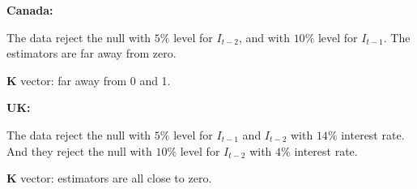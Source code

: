 \documentclass[12pt]{article}
\begin{document}
{\textbf {Canada:}}

The data reject the null with $ 5\% $ level for $ I_{t - 2} $, and with $ 10\% $ level
for $ I_{t - 1} $. The estimators are far away from zero.

$ \bm{K} $ vector: far away from 0 and 1.


{\textbf {UK:}}

The data reject the null with $ 5\% $ level for $ I_{t - 1} $ and $ I_{t - 2} $ with
$ 14\% $ interest rate. And they reject the null with $ 10\% $ level for $ I_{t - 2} $
with $ 4\% $ interest rate.


$ \bm{K} $ vector: estimators are all close to zero.
\end{document}
